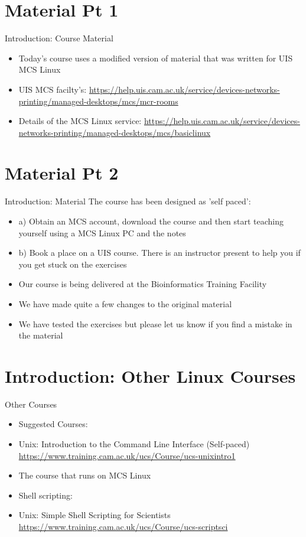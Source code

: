 \section{Material Pt 1}
\begin{frame}{Introduction: Course Material}
\begin{itemize}
\item Today's course uses a modified version of material that was written for UIS MCS Linux
\item UIS MCS facilty's: \url{https://help.uis.cam.ac.uk/service/devices-networks-printing/managed-desktops/mcs/mcr-rooms} 
\item Details of the MCS Linux service: \url{https://help.uis.cam.ac.uk/service/devices-networks-printing/managed-desktops/mcs/basiclinux} 
\end{itemize}
\end{frame}

\section{Material Pt 2}
\begin{frame}{Introduction: Material}
The course has been designed as 'self paced':
\begin{itemize}
\item a) Obtain an MCS account, download the course and then start teaching yourself using a MCS Linux PC and the notes
\item b) Book a place on a UIS course. There is an instructor present to help you if you get stuck on the exercises
\item Our course is being delivered at the Bioinformatics Training Facility
\item We have made quite a few changes to the original material
\item We have tested the exercises but please let us know if you find a mistake in the material 
\end{itemize}
\end{frame}

\section{Introduction: Other Linux Courses}
\begin{frame}{Other Courses}
\begin{itemize}
\item{Suggested Courses:}
\item Unix: Introduction to the Command Line Interface (Self-paced)
\small {\url{https://www.training.cam.ac.uk/ucs/Course/ucs-unixintro1}} 
\item{The course that runs on MCS Linux}
\pause
\item Shell scripting:
\item Unix: Simple Shell Scripting for Scientists
\small {\url{https://www.training.cam.ac.uk/ucs/Course/ucs-scriptsci}} 
\end{itemize}
\end{frame}

